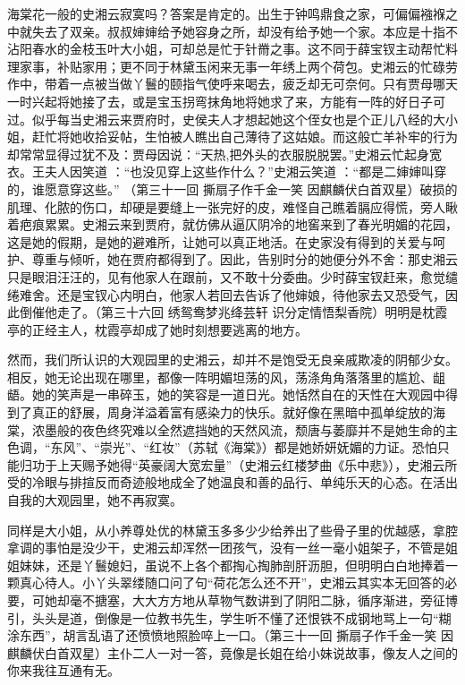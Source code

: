 \documentclass[openany,scheme = chinese, linespread = 1.5]{ctexbook}
\begin{document}
海棠花一般的史湘云寂寞吗？答案是肯定的。出生于钟鸣鼎食之家，可偏偏襁褓之中就失去了双亲。叔叔婶婶给予她容身之所，却没有给予她一个家。本应是十指不沾阳春水的金枝玉叶大小姐，可却总是忙于针黹之事。这不同于薛宝钗主动帮忙料理家事，补贴家用；更不同于林黛玉闲来无事一年绣上两个荷包。史湘云的忙碌劳作中，带着一点被当做丫鬟的颐指气使呼来喝去，疲乏却无可奈何。只有贾母哪天一时兴起将她接了去，或是宝玉拐弯抹角地将她求了来，方能有一阵的好日子可过。似乎每当史湘云来贾府时，史侯夫人才想起她这个侄女也是个正儿八经的大小姐，赶忙将她收拾妥帖，生怕被人瞧出自己薄待了这姑娘。而这般亡羊补牢的行为却常常显得过犹不及：贾母因说：“天热,把外头的衣服脱脱罢。”史湘云忙起身宽衣。王夫人因笑道 ：“也没见穿上这些作什么？”史湘云笑道 ：“都是二婶婶叫穿的，谁愿意穿这些。” （第三十一回 撕扇子作千金一笑 因麒麟伏白首双星）破损的肌理、化脓的伤口，却硬是要缝上一张完好的皮，难怪自己瞧着膈应得慌，旁人瞅着疤痕累累。史湘云来到贾府，就仿佛从逼仄阴冷的地窖来到了春光明媚的花园，这是她的假期，是她的避难所，让她可以真正地活。在史家没有得到的关爱与呵护、尊重与倾听，她在贾府都得到了。因此，告别时分的她便分外不舍：那史湘云只是眼泪汪汪的，见有他家人在跟前，又不敢十分委曲。少时薛宝钗赶来，愈觉缱绻难舍。还是宝钗心内明白，他家人若回去告诉了他婶娘，待他家去又恐受气，因此倒催他走了。（第三十六回 绣鸳鸯梦兆绛芸轩 识分定情悟梨香院）明明是枕霞亭的正经主人，枕霞亭却成了她时刻想要逃离的地方。

然而，我们所认识的大观园里的史湘云，却并不是饱受无良亲戚欺凌的阴郁少女。相反，她无论出现在哪里，都像一阵明媚坦荡的风，荡涤角角落落里的尴尬、龃龉。她的笑声是一串碎玉，她的笑容是一道日光。她恬然自在的天性在大观园中得到了真正的舒展，周身洋溢着富有感染力的快乐。就好像在黑暗中孤单绽放的海棠，浓墨般的夜色终究难以全然遮挡她的天然风流，颓唐与萎靡并不是她生命的主色调，“东风”、“崇光”、“红妆”（苏轼《海棠》）都是她娇妍妩媚的力证。恐怕只能归功于上天赐予她得“英豪阔大宽宏量”（史湘云红楼梦曲《乐中悲》），史湘云所受的冷眼与排揎反而奇迹般地成全了她温良和善的品行、单纯乐天的心态。在活出自我的大观园里，她不再寂寞。

同样是大小姐，从小养尊处优的林黛玉多多少少给养出了些骨子里的优越感，拿腔拿调的事怕是没少干，史湘云却浑然一团孩气，没有一丝一毫小姐架子，不管是姐姐妹妹，还是丫鬟媳妇，虽说不上各个都掏心掏肺剖肝沥胆，但明明白白地捧着一颗真心待人。小丫头翠缕随口问了句“荷花怎么还不开”，史湘云其实本无回答的必要，可她却毫不搪塞，大大方方地从草物气数讲到了阴阳二脉，循序渐进，旁征博引，头头是道，倒像是一位教书先生，学生听不懂了还恨铁不成钢地骂上一句“糊涂东西”，胡言乱语了还愤愤地照脸啐上一口。（第三十一回 撕扇子作千金一笑 因麒麟伏白首双星）主仆二人一对一答，竟像是长姐在给小妹说故事，像友人之间的你来我往互通有无。
\end{document}
